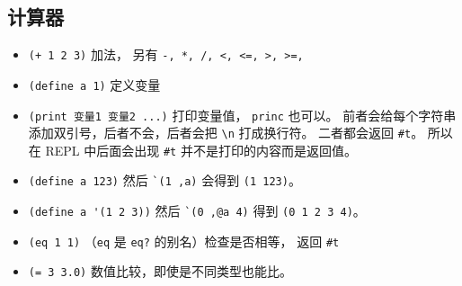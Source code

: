 \subsection{计算器}
\begin{itemize}
\item \verb`(+ 1 2 3)` 加法， 另有 \verb`-, *, /, <, <=, >, >=, `
\item \verb`(define a 1)` 定义变量
\item \verb`(print 变量1 变量2 ...)` 打印变量值， \verb`princ` 也可以。 前者会给每个字符串添加双引号，后者不会，后者会把 \verb`\n` 打成换行符。 二者都会返回 \verb`#t`。 所以在 REPL 中后面会出现 \verb`#t` 并不是打印的内容而是返回值。
\item \verb`(define a 123)` 然后 \verb|`(1 ,a)| 会得到 \verb`(1 123)`。
\item \verb`(define a '(1 2 3))` 然后 \verb|`(0 ,@a 4)| 得到 \verb`(0 1 2 3 4)`。
\item \verb`(eq 1 1)` （\verb`eq` 是 \verb`eq?` 的别名）检查是否相等， 返回 \verb`#t`
\item \verb`(= 3 3.0)` 数值比较，即使是不同类型也能比。
\end{itemize}

